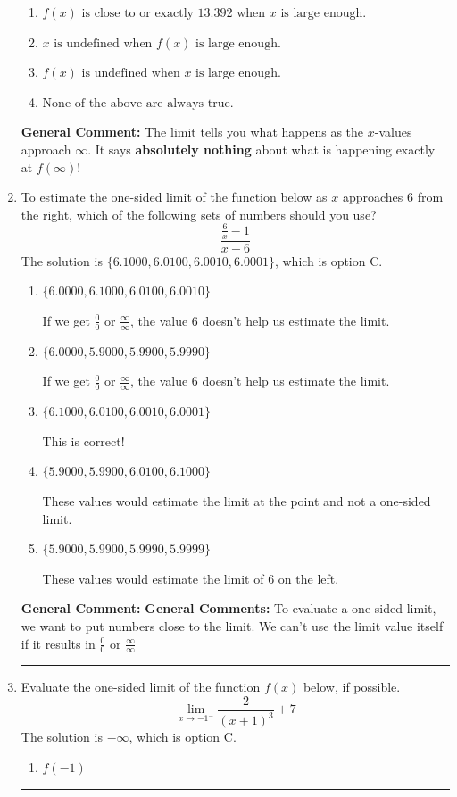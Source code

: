 \documentclass{extbook}[14pt]
\newcommand{\litem}[1]{\item #1

\rule{\textwidth}{0.4pt}}
\begin{document}
\begin{enumerate}
{\begin{enumerate}[label=\Alph*.]
\item \( f(x) \text{ is close to or exactly } 13.392 \text{ when } x \text{ is large enough}. \)


\item \( x \text{ is undefined when } f(x) \text{ is large enough}. \)


\item \( f(x) \text{ is undefined when } x \text{ is large enough}. \)


\item \( \text{None of the above are always true.} \)


\end{enumerate}

\textbf{General Comment:} The limit tells you what happens as the $x$-values approach $\infty$. It says \textbf{absolutely nothing} about what is happening exactly at $f(\infty)$!
}
\litem{
To estimate the one-sided limit of the function below as $x$ approaches 6 from the right, which of the following sets of numbers should you use?
\[ \frac{\frac{6}{x} - 1}{x - 6} \]The solution is \( \{ 6.1000, 6.0100, 6.0010, 6.0001 \} \), which is option C.\begin{enumerate}[label=\Alph*.]
\item \( \{ 6.0000, 6.1000, 6.0100, 6.0010 \} \)

If we get $\frac{0}{0}$ or $\frac{\infty}{\infty}$, the value 6 doesn't help us estimate the limit.
\item \( \{ 6.0000, 5.9000, 5.9900, 5.9990 \} \)

If we get $\frac{0}{0}$ or $\frac{\infty}{\infty}$, the value 6 doesn't help us estimate the limit.
\item \( \{ 6.1000, 6.0100, 6.0010, 6.0001 \} \)

This is correct!
\item \( \{ 5.9000, 5.9900, 6.0100, 6.1000 \} \)

These values would estimate the limit at the point and not a one-sided limit.
\item \( \{ 5.9000, 5.9900, 5.9990, 5.9999 \} \)

These values would estimate the limit of 6 on the left.
\end{enumerate}

\textbf{General Comment:} \textbf{General Comments:} To evaluate a one-sided limit, we want to put numbers close to the limit. We can't use the limit value itself if it results in $\frac{0}{0}$ or $\frac{\infty}{\infty}$
}
\litem{
Evaluate the one-sided limit of the function $f(x)$ below, if possible.
\[ \lim_{x \rightarrow -1^-} \frac{2}{(x+1)^3}+7 \]The solution is \( -\infty \), which is option C.\begin{enumerate}[label=\Alph*.]
\item \( f(-1) \)



\end{enumerate}}
\end{enumerate}
\end{document}
